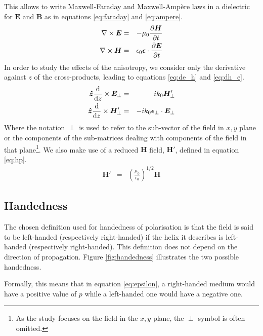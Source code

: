 This allows to write Maxwell-Faraday and Maxwell-Ampère laws in a dielectric for $\bm{E}$ and $\bm{B}$ as in equations \ref{eq:faraday} and \ref{eq:ampere}.
\begin{eqnarray}
\nabla \times\bm{E} &=& -\mu_0\pdv{\bm{H}}{t}\label{eq:faraday}\\
\nabla \times\bm{H} &=& \epsilon_0\bm{\epsilon}\cdot\pdv{\bm{E}}{t}\label{eq:ampere}
\end{eqnarray}
%
In order to study the effects of the anisotropy, we consider only the derivative against $z$ of the cross-products, leading to equations \ref{eq:de_h} and \ref{eq:dh_e}.
\begin{eqnarray}
\bm{\hat{z}}\dv{z}\times\bm{E}_\perp &=& ik_0\bm{H}'_\perp \label{eq:de_h}\\
\bm{\hat{z}}\dv{z}\times\bm{H}'_\perp &=& -ik_0\bm{\epsilon}_\perp\cdot\bm{E}_\perp \label{eq:dh_e}
\end{eqnarray}
%
Where the notation $\perp$ is used to refer to the sub-vector of the field in $x,y$ plane or the components of the sub-matrices dealing with components of the field in that plane\footnote{As the study focuses on the field in the $x,y$ plane, the $\perp$ symbol is often omitted.}. We also make use of a reduced $\bm{H}$ field, $\bm{H'}$, defined in equation \ref{eq:hp}. 
\begin{eqnarray}
\bm{H}' &=& \left(\frac{\mu_0}{\epsilon_0}\right)^{1/2}\bm{H} \label{eq:hp}
\end{eqnarray}

\subsection{Handedness}
\label{seq:handedness}
The chosen definition used for handedness of polarisation is that the field is said to be left-handed (respectively right-handed) if the helix it describes is left-handed (respectively right-handed). This definition does not depend on the direction of propagation. Figure \ref{fig:handedness} illustrates the two possible handedness.

Formally, this means that in equation \ref{eq:epsilon}, a right-handed medium would have a positive value of $p$ while a left-handed one would have a negative one.

